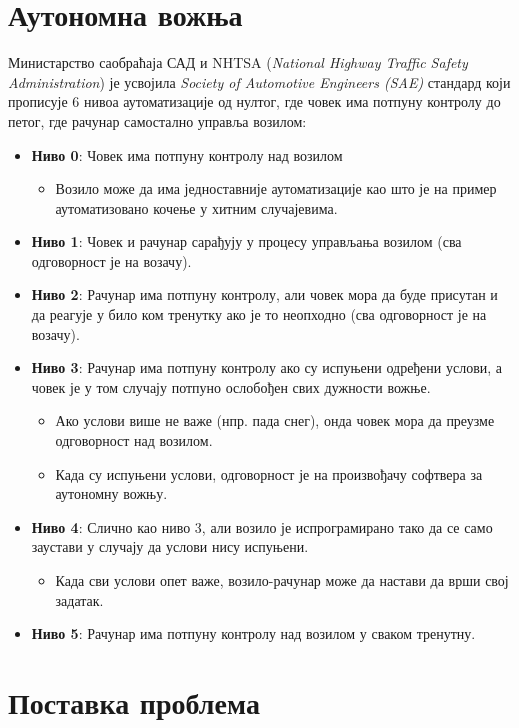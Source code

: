 \documentclass[11pt,oneside]{memoir}
\begin{document}
\section{Аутономна вожња}

Министарство саобраћаја САД и NHTSA (\textit{National Highway Traffic Safety Administration}) је усвојила \textit{Society of Automotive Engineers (SAE)}
стандард који прописује 6 нивоа аутоматизације од нултог, где човек има потпуну контролу до петог, где рачунар самостално управља возилом:\cite{ad_survey}
\begin{itemize}
  \item \textbf{Ниво 0}: Човек има потпуну контролу над возилом
    \begin{itemize}
      \item Возило може да има једноставније аутоматизације као што је на пример аутоматизовано кочење у хитним случајевима.
    \end{itemize}
  \item \textbf{Ниво 1}: Човек и рачунар сарађују у процесу управљања возилом (сва одговорност је на возачу).
  \item \textbf{Ниво 2}: Рачунар има потпуну контролу, али човек мора да буде присутан и да реагује у било ком тренутку ако је то неопходно (сва одговорност је на возачу).
  \item \textbf{Ниво 3}: Рачунар има потпуну контролу ако су испуњени одређени услови, а човек је у том случају потпуно ослобођен свих дужности вожње. 
    \begin{itemize}
      \item Ако услови више не важе (нпр. пада снег), онда човек мора да преузме одговорност над возилом.
      \item Када су испуњени услови, одговорност је на произвођачу софтвера за аутономну вожњу.
    \end{itemize}
  \item  \textbf{Ниво 4}: Слично као ниво 3, али возило је испрограмирано тако да се само заустави у случају да услови нису испуњени.
    \begin{itemize}
      \item Када сви услови опет важе, возило-рачунар може да настави да врши свој задатак.
    \end{itemize}
  \item  \textbf{Ниво 5}: Рачунар има потпуну контролу над возилом у сваком тренутну.
\end{itemize}

\section{Поставка проблема}
\end{document}
